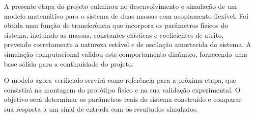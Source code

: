 \documentclass[9pt,a4paper,twocolumn,twoside]{tau-class/tau}
\begin{document}
 A presente etapa do projeto culminou no desenvolvimento e simulação de um modelo matemático para o sistema de duas massas com acoplamento flexível. Foi obtida uma função de transferência que incorpora os parâmetros físicos do sistema, incluindo as massas, constantes elásticas e coeficientes de atrito, prevendo corretamente a natureza estável e de oscilação amortecida do sistema. A simulação computacional validou este comportamento dinâmico, fornecendo uma base sólida para a continuidade do projeto.

 O modelo agora verificado servirá como referência para a próxima etapa, que consistirá na montagem do protótipo físico e na sua validação experimental. O objetivo será determinar os parâmetros reais do sistema construído e comparar sua resposta a um sinal de entrada com os resultados simulados.



\printbibliography

\end{document}
